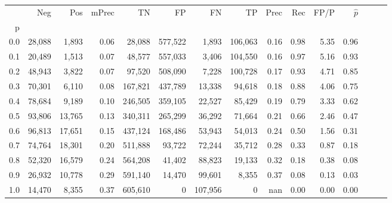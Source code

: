 \begin{tabular}{rrrrrrrrrrrrrrr}
\toprule
{} &     Neg &     Pos & mPrec &       TN &       FP &       FN &       TP &  Prec &   Rec &  FP/P & $\hat{p}$ \\
p   &         &         &       &          &          &          &          &       &       &       &           \\
\midrule
0.0 &  28,088 &   1,893 &  0.06 &   28,088 &  577,522 &    1,893 &  106,063 &  0.16 &  0.98 &  5.35 &      0.96 \\
0.1 &  20,489 &   1,513 &  0.07 &   48,577 &  557,033 &    3,406 &  104,550 &  0.16 &  0.97 &  5.16 &      0.93 \\
0.2 &  48,943 &   3,822 &  0.07 &   97,520 &  508,090 &    7,228 &  100,728 &  0.17 &  0.93 &  4.71 &      0.85 \\
0.3 &  70,301 &   6,110 &  0.08 &  167,821 &  437,789 &   13,338 &   94,618 &  0.18 &  0.88 &  4.06 &      0.75 \\
0.4 &  78,684 &   9,189 &  0.10 &  246,505 &  359,105 &   22,527 &   85,429 &  0.19 &  0.79 &  3.33 &      0.62 \\
0.5 &  93,806 &  13,765 &  0.13 &  340,311 &  265,299 &   36,292 &   71,664 &  0.21 &  0.66 &  2.46 &      0.47 \\
0.6 &  96,813 &  17,651 &  0.15 &  437,124 &  168,486 &   53,943 &   54,013 &  0.24 &  0.50 &  1.56 &      0.31 \\
0.7 &  74,764 &  18,301 &  0.20 &  511,888 &   93,722 &   72,244 &   35,712 &  0.28 &  0.33 &  0.87 &      0.18 \\
0.8 &  52,320 &  16,579 &  0.24 &  564,208 &   41,402 &   88,823 &   19,133 &  0.32 &  0.18 &  0.38 &      0.08 \\
0.9 &  26,932 &  10,778 &  0.29 &  591,140 &   14,470 &   99,601 &    8,355 &  0.37 &  0.08 &  0.13 &      0.03 \\
1.0 &  14,470 &   8,355 &  0.37 &  605,610 &        0 &  107,956 &        0 &   nan &  0.00 &  0.00 &      0.00 \\
\bottomrule
\end{tabular}

